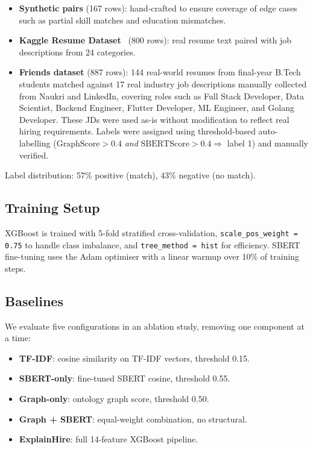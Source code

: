 \documentclass[conference]{IEEEtran}
\begin{document}
\begin{itemize}
  \item \textbf{Synthetic pairs} (167 rows): hand-crafted to ensure coverage
        of edge cases such as partial skill matches and education mismatches.
  \item \textbf{Kaggle Resume Dataset}~\cite{kaggle_resume} (800 rows): real
        resume text paired with job descriptions from 24 categories.
  \item \textbf{Friends dataset} (887 rows): 144 real-world resumes from
        final-year B.Tech students matched against 17 real industry job
        descriptions manually collected from Naukri and LinkedIn, covering
        roles such as Full Stack Developer, Data Scientist, Backend Engineer,
        Flutter Developer, ML Engineer, and Golang Developer. These JDs were
        used as-is without modification to reflect real hiring requirements.
        Labels were assigned using threshold-based auto-labelling
        ($\text{GraphScore} > 0.4$ \textit{and} $\text{SBERTScore} > 0.4
        \Rightarrow$ label 1) and manually verified.
\end{itemize}

Label distribution: 57\% positive (match), 43\% negative (no match).

\subsection{Training Setup}
XGBoost is trained with 5-fold stratified cross-validation,
\texttt{scale\_pos\_weight = 0.75} to handle class imbalance, and
\texttt{tree\_method = hist} for efficiency. SBERT fine-tuning uses the
Adam optimiser with a linear warmup over 10\% of training steps.

\subsection{Baselines}
We evaluate five configurations in an ablation study, removing one
component at a time:

\begin{itemize}
  \item \textbf{TF-IDF}: cosine similarity on TF-IDF vectors, threshold 0.15.
  \item \textbf{SBERT-only}: fine-tuned SBERT cosine, threshold 0.55.
  \item \textbf{Graph-only}: ontology graph score, threshold 0.50.
  \item \textbf{Graph + SBERT}: equal-weight combination, no structural.
  \item \textbf{ExplainHire}: full 14-feature XGBoost pipeline.
\end{itemize}
\end{document}
